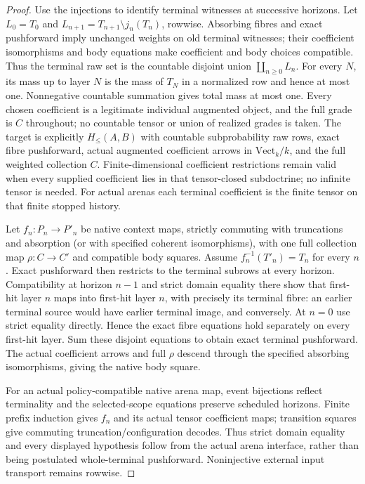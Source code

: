 \documentclass{article}
\begin{document}
\begin{proof}
Use the injections to identify terminal witnesses at successive horizons.
Let $L_0=T_0$ and $L_{n+1}=T_{n+1}\setminus j_n(T_n)$, rowwise.
Absorbing fibres and exact pushforward imply unchanged weights on old
terminal witnesses; their coefficient isomorphisms and body equations make
coefficient and body choices compatible. Thus the terminal raw set is the
countable disjoint union $\coprod_{n\geq0}L_n$. For every $N$, its mass up
to layer $N$ is the mass of $T_N$ in a normalized row and hence at most one.
Nonnegative countable summation gives total mass at most one. Every chosen
coefficient is a legitimate individual augmented object, and the full grade
is $C$ throughout; no countable tensor or union of realized grades is taken. The target is
explicitly $H_{\leq}(A,B)$ with countable subprobability raw rows, exact
fibre pushforward, actual augmented coefficient arrows in
$\mathrm{Vect}_k/k$, and the full weighted collection $C$. Finite-dimensional
coefficient restrictions remain valid when every supplied coefficient lies
in that tensor-closed subdoctrine; no infinite tensor is needed.
For actual arenas each terminal coefficient is the finite tensor on that
finite stopped history.

Let $f_n:P_n\to P'_n$ be native context maps, strictly commuting with
truncations and absorption (or with specified coherent isomorphisms), with
one full collection map $\rho:C\to C'$ and compatible body squares.
Assume $f_n^{-1}(T'_n)=T_n$ for every $n$. Exact pushforward then restricts
to the terminal subrows at every horizon. Compatibility at horizon $n-1$
and strict domain equality there show that first-hit layer $n$ maps into
first-hit layer $n$, with precisely its terminal fibre: an earlier terminal
source would have earlier terminal image, and conversely. At $n=0$ use
strict equality directly. Hence the exact fibre equations hold separately
on every first-hit layer. Sum these disjoint equations to obtain exact
terminal pushforward. The actual coefficient arrows and full $\rho$ descend
through the specified absorbing isomorphisms, giving the native body square.

For an actual policy-compatible native arena map, event bijections reflect
terminality and the selected-scope equations preserve scheduled horizons.
Finite prefix induction gives $f_n$ and its actual tensor coefficient maps;
transition squares give commuting truncation/configuration decodes. Thus
strict domain equality and every displayed hypothesis follow from the
actual arena interface, rather than being postulated whole-terminal
pushforward. Noninjective external input transport remains rowwise.
\end{proof}
\end{document}
